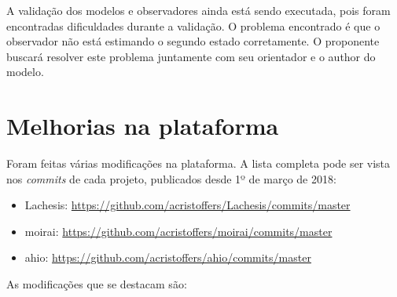 A validação dos modelos e observadores ainda está sendo executada, pois foram
encontradas dificuldades durante a validação. O problema encontrado é que o
observador não está estimando o segundo estado corretamente. O proponente
buscará resolver este problema juntamente com seu orientador e o author do
modelo.

\section{Melhorias na plataforma}%
\label{sec:platform-enhancements}

Foram feitas várias modificações na plataforma. A lista completa pode ser vista
nos \textit{commits} de cada projeto, publicados desde 1º de março de 2018:

\begin{itemize}
    \item Lachesis: \url{https://github.com/acristoffers/Lachesis/commits/master}
    \item moirai: \url{https://github.com/acristoffers/moirai/commits/master}
    \item ahio: \url{https://github.com/acristoffers/ahio/commits/master}
\end{itemize}

As modificações que se destacam são:

